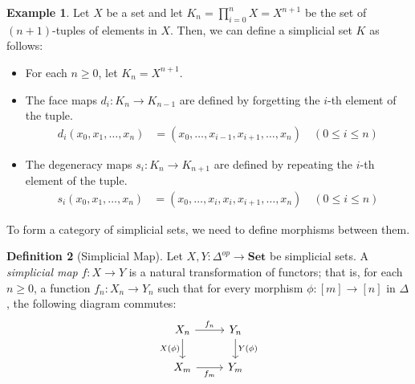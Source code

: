 \documentclass[11pt]{article}
\theoremstyle{definition}
\newtheorem{definition}{Definition}[section]
\newtheorem{example}[definition]{Example}
\theoremstyle{plain}
\begin{document}
\begin{example}
    Let $X$ be a set and let $K_n =\prod_{i=0}^n X=X^{n+1}$ be the set of $(n+1)$-tuples of elements in $X$. Then, we can define a simplicial set $K$ as follows:
    \begin{itemize}
        \item For each $n \geq 0$, let $K_n = X^{n+1}$.
        \item The face maps $d_i : K_n \to K_{n-1}$ are defined by forgetting the $i$-th element of the tuple.
              \begin{align*}
                  d_i(x_0, x_1, \ldots, x_n) & = (x_0, \ldots, x_{i-1}, x_{i+1}, \ldots, x_n) \quad (0 \leq i \leq n)
              \end{align*}
        \item The degeneracy maps $s_i : K_n \to K_{n+1}$ are defined by repeating the $i$-th element of the tuple.
              \begin{align*}
                  s_i(x_0, x_1, \ldots, x_n) & = (x_0, \ldots, x_i, x_i, x_{i+1}, \ldots, x_n) \quad (0 \leq i \leq n)
              \end{align*}
    \end{itemize}

\end{example}


To form a category of simplicial sets, we need to define morphisms between them.


\begin{definition}[Simplicial Map]
    Let $X, Y : \Delta^{op} \to \mathbf{Set}$ be simplicial sets. A \emph{simplicial map} $f : X \to Y$ is a natural transformation of functors; that is, for each $n \geq 0$, a function $f_n : X_n \to Y_n$ such that for every morphism $\phi : [m] \to [n]$ in $\Delta$, the following diagram commutes:
    \[
        \begin{tikzcd}
            X_n \arrow[r,"f_n"] \arrow[d,"X(\phi)"'] & Y_n \arrow[d,"Y(\phi)"] \\
            X_m \arrow[r,"f_m"'] & Y_m
        \end{tikzcd}
    \]

\end{definition}
\end{document}
